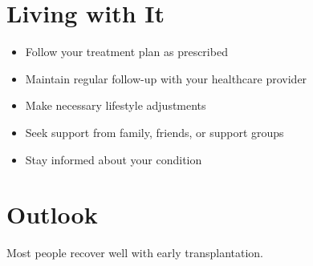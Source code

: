 \section{Living with It}
\begin{itemize}[noitemsep]
  \item Follow your treatment plan as prescribed
  \item Maintain regular follow-up with your healthcare provider
  \item Make necessary lifestyle adjustments
  \item Seek support from family, friends, or support groups
  \item Stay informed about your condition
\end{itemize}
\section{Outlook}
Most people recover well with early transplantation.
